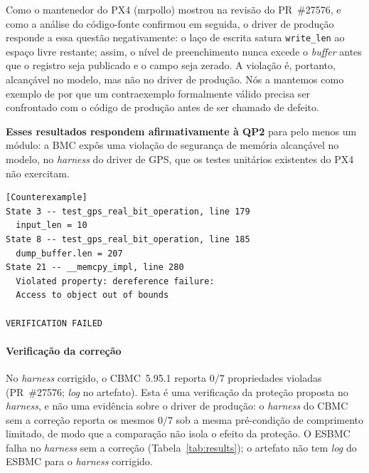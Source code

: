 \documentclass[conference]{IEEEtran}
\begin{document}
Como o mantenedor do PX4 (mrpollo) mostrou na revisão do PR~\#27576,
e como a análise do código-fonte confirmou em seguida, o driver de
produção responde a essa questão negativamente: o laço de escrita
satura \texttt{write\_len} ao espaço livre restante; assim, o nível
de preenchimento nunca excede o \textit{buffer} antes que o registro
seja publicado e o campo seja zerado. A violação é, portanto,
alcançável no modelo, mas não no driver de produção. Nós a mantemos
como exemplo de por que um contraexemplo formalmente válido precisa
ser confrontado com o código de produção antes de ser chamado de
defeito.
\begin{rqbox}
\textbf{Esses resultados respondem afirmativamente à QP2} para pelo
menos um módulo: a BMC expôs uma violação de segurança de memória
alcançável no modelo, no \textit{harness} do driver de GPS, que os
testes unitários existentes do PX4 não exercitam.
\end{rqbox}

\begin{lstlisting}[float=t,basicstyle=\ttfamily\scriptsize,
numbers=none,language={},captionpos=b,
caption={Contraexemplo do ESBMC: \textit{underflow} sem sinal em
\texttt{dumpGpsData()} se propaga para um \texttt{memcpy} fora dos
limites (CWE-191 $\rightarrow$ CWE-119). O \texttt{dump\_buffer}
local do \textit{harness} é o \textit{buffer} \texttt{dump\_data}
passado ao driver.},label=lst:bug-gps]
[Counterexample]
State 3 -- test_gps_real_bit_operation, line 179
  input_len = 10
State 8 -- test_gps_real_bit_operation, line 185
  dump_buffer.len = 207
State 21 -- __memcpy_impl, line 280
  Violated property: dereference failure:
  Access to object out of bounds

VERIFICATION FAILED
\end{lstlisting}

\paragraph{Verificação da correção}
No \textit{harness} corrigido, o CBMC~5.95.1 reporta $0/7$
propriedades violadas (PR~\#27576; \textit{log} no artefato). Esta é
uma verificação da proteção proposta no \textit{harness}, e não uma
evidência sobre o driver de produção: o \textit{harness} do CBMC sem
a correção reporta os mesmos $0/7$ sob a mesma pré-condição de
comprimento limitado, de modo que a comparação não isola o efeito da
proteção. O ESBMC falha no \textit{harness} sem a correção
(Tabela~\ref{tab:results}); o artefato não tem \textit{log} do ESBMC
para o \textit{harness} corrigido.
\end{document}

